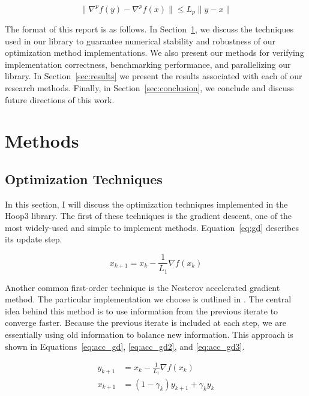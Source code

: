 \documentclass[journal]{IEEEtran}
\begin{document}
\begin{equation}
    \| \nabla^p f(y) - \nabla^p f(x) \| \le L_p \| y - x \|
    \label{eq:lipschitz_definition}
\end{equation}

The format of this report is as follows. In Section~\ref{sec:methods}, we discuss the techniques used in our library to guarantee numerical stability and robustness of our optimization method implementations. We also present our methods for verifying implementation correctness, benchmarking performance, and parallelizing our library. In Section~\ref{sec:results} we present the results associated with each of our research methods. Finally, in Section~\ref{sec:conclusion}, we conclude and discuss future directions of this work.


\section{Methods}
\label{sec:methods}

\subsection{Optimization Techniques}

In this section, I will discuss the optimization techniques implemented in the Hoop3 library. The first of these techniques is the gradient descent, one of the most widely-used and simple to implement methods. Equation~\ref{eq:gd} describes its update step.

\begin{equation}
    x_{k+1} = x_k - \frac{1}{L_1} \nabla f(x_k)
    \label{eq:gd}
\end{equation}

Another common first-order technique is the Nesterov accelerated gradient method. The particular implementation we choose is outlined in \cite{acc_gradient_princeton}. The central idea behind this method is to use information from the previous iterate to converge faster. Because the previous iterate is included at each step, we are essentially using old information to balance new information. This approach is shown in Equations~\ref{eq:acc_gd}, \ref{eq:acc_gd2}, and \ref{eq:acc_gd3}.

\begin{equation}
    \begin{split}
    y_{k+1} &= x_k - \frac{1}{L_1} \nabla f(x_k) \\
    x_{k+1} &= (1 - \gamma_k) y_{k+1} + \gamma_k y_k
    \end{split}
    \label{eq:acc_gd}
\end{equation}
\end{document}
